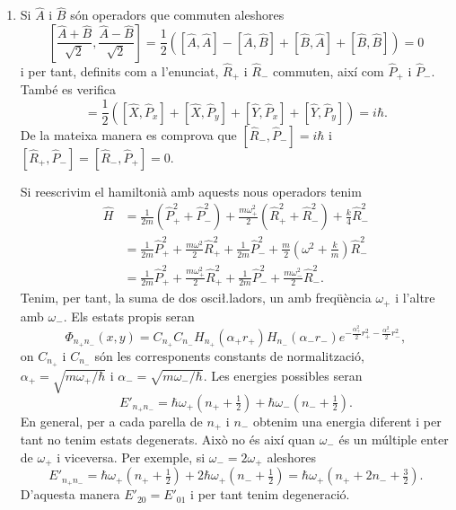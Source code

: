 \documentclass[12pt]{article}
\numberwithin{table}{section}
\numberwithin{figure}{section}
\numberwithin{equation}{section}
\begin{document}
\begin{enumerate}[label=(\alph*), font=\bfseries \sffamily, wide, labelwidth=!, labelindent=0pt]
	\item Si \( \hat{A} \) i \( \hat{B} \) són operadors que commuten aleshores 
		\begin{equation*}
			\left[\frac{\hat{A} + \hat{B}}{\sqrt{2}}, \frac{\hat{A} - \hat{B}}{\sqrt{2}}\right] = \frac{1}{2} \left([\hat{A}, \hat{A}] - [\hat{A}, \hat{B}] + [\hat{B}, \hat{A}] + [\hat{B}, \hat{B}]\right) = 0
		\end{equation*}
		i per tant, definits com a l'enunciat, \( \hat{R}_+ \) i \( \hat{R}_- \) commuten, així com \( \hat{P}_+ \) i \( \hat{P}_- \). També es verifica
		\begin{equation*}
			[\hat{R}_+, \hat{P}_+] = \frac{1}{2}\left([\hat{X}, \hat{P}_x] + [\hat{X}, \hat{P}_y] + [\hat{Y}, \hat{P}_x] + [\hat{Y}, \hat{P}_y]\right) = i\hbar.
		\end{equation*}
		De la mateixa manera es comprova que \( [\hat{R}_-, \hat{P}_-] = i \hbar \) i \( [\hat{R}_+, \hat{P}_-] = [\hat{R}_-, \hat{P}_+] = 0 \).

		Si reescrivim el hamiltonià amb aquests nous operadors tenim
		\begin{align*}
			\hat{H} &= \frac{1}{2m}\left(\hat{P}_+^2 + \hat{P}_-^2\right) + \frac{m\omega_+^2}{2}\left(\hat{R}_+^2 + \hat{R}_-^2\right) + \frac{k}{4} \hat{R}_-^2 \\
							&= \frac{1}{2m}\hat{P}_+^2 + \frac{m\omega^2}{2}\hat{R}_+^2 + \frac{1}{2m}\hat{P}_-^2 + \frac{m}{2}\left(\omega^2 + \frac{k}{m}\right)\hat{R}_-^2 \\
							&= \frac{1}{2m}\hat{P}_+^2 + \frac{m\omega_+^2}{2}\hat{R}_+^2 + \frac{1}{2m}\hat{P}_-^2 + \frac{m\omega_-^2}{2}\hat{R}_-^2 .
		\end{align*}
		Tenim, per tant, la suma de dos osci\l.ladors, un amb freqüència \( \omega_+ \) i l'altre amb \( \omega_- \). Els estats propis seran
		\begin{equation*}
			\Phi_{n_+ n_-}(x,y) = C_{n_+} C_{n_-} H_{n_+}(\alpha_+ r_+) H_{n_-}(\alpha_- r_-) e^{-\frac{\alpha_+^2}{2}r_+^2 -\frac{\alpha_-^2}{2}r_-^2},
		\end{equation*}
		on \( C_{n_+} \) i \( C_{n_-} \) són les corresponents constants de normalització, \( \alpha_+ = \sqrt{m\omega_+/\hbar} \) i \( \alpha_- = \sqrt{m\omega_-/ \hbar} \). Les energies possibles seran
		\begin{equation*}
			E'_{n_+ n_-} = \hbar \omega_{+}\left(n_+ + \tfrac{1}{2}\right) + \hbar \omega_-\left(n_- + \tfrac{1}{2}\right).
		\end{equation*}
		En general, per a cada parella de \( n_+ \) i \( n_- \) obtenim una energia diferent i per tant no tenim estats degenerats. Això no és així quan \( \omega_- \) és un múltiple enter de \( \omega_+ \) i viceversa. Per exemple, si \( \omega_- = 2\omega_+ \) aleshores
		\begin{equation*}
			E'_{n_+ n_-} = \hbar\omega_+\left(n_+ + \tfrac{1}{2}\right) + 2\hbar \omega_+\left(n_- + \tfrac{1}{2}\right) = \hbar \omega_+ \left(n_+ + 2n_- + \tfrac{3}{2}\right).
		\end{equation*}
		D'aquesta manera \( E'_{20} = E'_{01} \) i per tant tenim degeneració. 


\end{enumerate}
\end{document}
